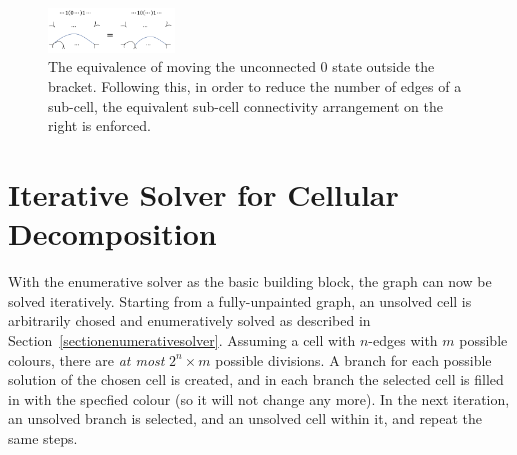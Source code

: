 \documentclass[journal]{IEEEtran}
\begin{document}
\begin{figure}[t]
\centering
\includegraphics[width = 0.3\textwidth]{figures/proof/equiv_zero}
\caption{The equivalence of moving the unconnected $0$ state outside the bracket. Following this, in order to reduce the number of edges of a sub-cell, the equivalent sub-cell connectivity arrangement on the right is enforced.}
\label{figconstraint}
\end{figure} 


\section{Iterative Solver for Cellular Decomposition}
\label{sectioniterativesolver}

With the enumerative solver as the basic building block, the graph can now be solved iteratively.
Starting from a fully-unpainted graph, an unsolved cell is arbitrarily chosed and enumeratively solved as 
described in Section~\ref{sectionenumerativesolver}. %
Assuming a cell with $n$-edges with $m$ possible colours, there are \textit{at most} $2^n\times m$ possible divisions. A branch for each possible solution of the chosen cell is created, and in each branch the selected cell is filled in with the specfied colour (so it will not change any more). 
In the next iteration, an unsolved branch is selected, and an unsolved cell within it, and repeat the same steps.
 
\end{document}
